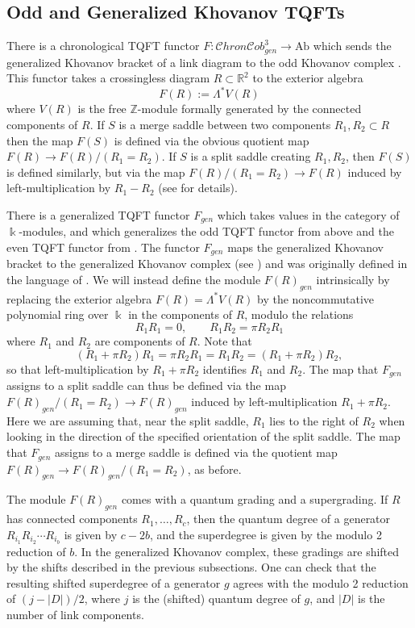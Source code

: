 \documentclass[12pt]{amsart}
\theoremstyle{definition}
\theoremstyle{plain}
\newcommand{\cobIIIgen}{\mathcal{C}hron\mathcal{C}ob^3_{gen}}
\begin{document}
\subsection{Odd and Generalized Khovanov TQFTs}\label{subs:TQFTs}

There is a chronological TQFT functor $F\colon\cobIIIgen\rightarrow\mbox{Ab}$ which
sends the generalized Khovanov bracket of a link diagram to the odd Khovanov complex
\cite{ORS2007,Pu2015}.
This functor takes
a crossingless diagram $R\subset\mathbb{R}^2$ to the exterior algebra
\[
F(R):=\Lambda^*V(R)
\]
where $V(R)$ is the free $\mathbb{Z}$-module formally generated by the connected components of $R$.
If $S$ is a merge saddle between two components $R_1,R_2\subset R$
then the map $F(S)$ is defined 
 via the obvious quotient map $F(R)\rightarrow F(R)/(R_1=R_2)$.
 If $S$ is a split saddle creating $R_1,R_2$, then $F(S)$ is defined similarly,
 but via the map $F(R)/(R_1=R_2)\rightarrow F(R)$ induced by left-multiplication by $R_1-R_2$
(see \cite{ORS2007}  for details).

There is a generalized TQFT functor $F_{gen}$ which takes
values in the category of $\Bbbk$-modules, and which generalizes the odd TQFT functor
from above
and the even TQFT functor from \cite{Kh1999}.
The functor $F_{gen}$ maps the generalized Khovanov bracket
to the generalized Khovanov complex (see \cite{Pu2015}) and was originally
defined in the language of \cite{Bn2002}.
We will instead define the module $F(R)_{gen}$ intrinsically by replacing the exterior algebra $F(R)=\Lambda^*V(R)$ by the
noncommutative polynomial ring over $\Bbbk$ in the components of $R$, modulo the relations
\[
R_1R_1=0,\qquad R_1R_2=\pi R_2R_1
\]
where $R_1$ and $R_2$ are components of $R$. Note that
\[
(R_1+\pi R_2)R_1=\pi R_2R_1=R_1R_2=(R_1+\pi R_2)R_2,
\]
so that left-multiplication by $R_1+\pi R_2$ identifies $R_1$ and $R_2$.
The map that $F_{gen}$ assigns to a split saddle can thus be defined via the map
$F(R)_{gen}/(R_1=R_2)\rightarrow F(R)_{gen}$ induced by left-multiplication $R_1+\pi R_2$.
Here we are assuming that, near the split saddle, $R_1$ lies to the right
of $R_2$ when looking in the direction of the specified orientation of the split saddle.
The map that $F_{gen}$ assigns to a merge saddle is defined via the quotient map
$F(R)_{gen}\rightarrow F(R)_{gen}/(R_1=R_2)$, as before.

The module $F(R)_{gen}$ comes with
a quantum grading and a supergrading. 
If $R$ has connected components $R_1,\ldots,R_c$, then 
the quantum degree of a generator $R_{i_1}R_{i_2}\cdots R_{i_b}$
is given by \mbox{$c-2b$}, and the superdegree is given by the modulo 2 reduction of $b$. 
In the generalized Khovanov complex, these gradings are shifted by the
shifts described in the previous subsections. One can check that the resulting shifted superdegree
of a generator $g$ agrees with the modulo 2 reduction of $(j-|D|)/2$,
where $j$ is the (shifted) quantum degree of $g$, and $|D|$ is the number of link components.
\end{document}
